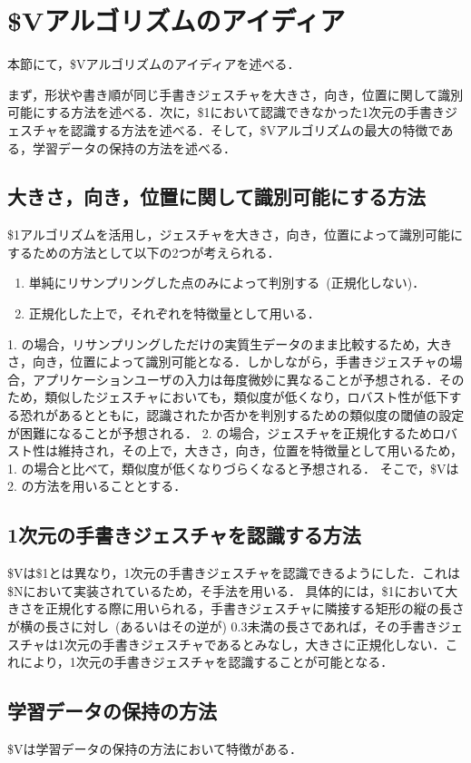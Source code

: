 \section{\$Vアルゴリズムのアイディア}
本節にて，\$Vアルゴリズムのアイディアを述べる．

まず，形状や書き順が同じ手書きジェスチャを大きさ，向き，位置に関して識別可能にする方法を述べる．次に，\$1において認識できなかった1次元の手書きジェスチャを認識する方法を述べる．そして，\$Vアルゴリズムの最大の特徴である，学習データの保持の方法を述べる．

\subsection{大きさ，向き，位置に関して識別可能にする方法}
\$1アルゴリズムを活用し，ジェスチャを大きさ，向き，位置によって識別可能にするための方法として以下の2つが考えられる．
\begin{enumerate}
\item 単純にリサンプリングした点のみによって判別する~(正規化しない)．
\item 正規化した上で，それぞれを特徴量として用いる．
\end{enumerate}
1. の場合，リサンプリングしただけの実質生データのまま比較するため，大きさ，向き，位置によって識別可能となる．しかしながら，手書きジェスチャの場合，アプリケーションユーザの入力は毎度微妙に異なることが予想される．そのため，類似したジェスチャにおいても，類似度が低くなり，ロバスト性が低下する恐れがあるとともに，認識されたか否かを判別するための類似度の閾値の設定が困難になることが予想される．
2. の場合，ジェスチャを正規化するためロバスト性は維持され，その上で，大きさ，向き，位置を特徴量として用いるため，1. の場合と比べて，類似度が低くなりづらくなると予想される．
そこで，\$Vは2. の方法を用いることとする．

\subsection{1次元の手書きジェスチャを認識する方法}
\$Vは\$1とは異なり，1次元の手書きジェスチャを認識できるようにした．これは\$N\cite{Anthony:2010:LMR:1839214.1839258}において実装されているため，そ手法を用いる．
具体的には，\$1において大きさを正規化する際に用いられる，手書きジェスチャに隣接する矩形の縦の長さが横の長さに対し~(あるいはその逆が) 0.3未満の長さであれば，その手書きジェスチャは1次元の手書きジェスチャであるとみなし，大きさに正規化しない．これにより，1次元の手書きジェスチャを認識することが可能となる．

\subsection{学習データの保持の方法}
\$Vは学習データの保持の方法において特徴がある．

